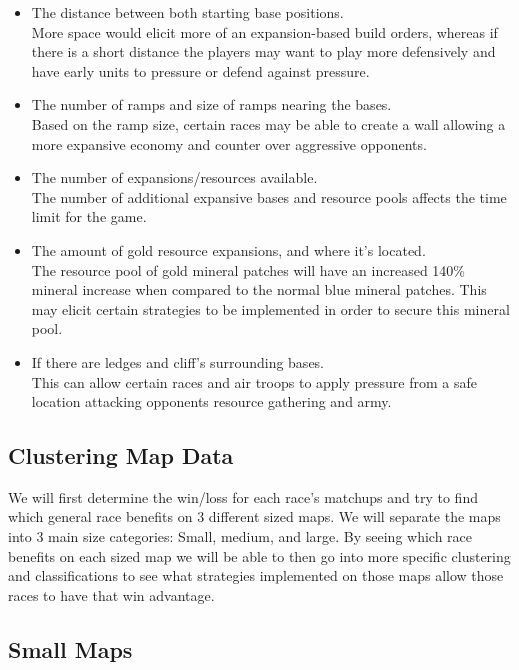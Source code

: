 \documentclass[a4paper,12pt]{report}
\begin{document}
\begin{itemize}
\item The distance between both starting base positions. \\
More space would elicit more of an expansion-based build orders, whereas if there is a short distance the players may want to play more defensively and have early units to pressure or defend against pressure.
\item The number of ramps and size of ramps nearing the bases. \\
Based on the ramp size, certain races may be able to create a wall allowing a more expansive economy and counter over aggressive opponents.
\item The number of expansions/resources available. \\
The number of additional expansive bases and resource pools affects the time limit for the game.
\item The amount of gold resource expansions, and where it’s located. \\
The resource pool of gold mineral patches will have an increased 140\% mineral increase when compared to the normal blue mineral patches. This may elicit certain strategies to be implemented in order to secure this mineral pool.
\item If there are ledges and cliff’s surrounding bases. \\
This can allow certain races and air troops to apply pressure from a safe location attacking opponents resource gathering and army.
\end{itemize}

\subsection{Clustering Map Data}

We will first determine the win/loss for each race’s matchups and try to find which general race benefits on 3 different sized maps. We will separate the maps into 3 main size categories: Small, medium, and large. By seeing which race benefits on each sized map we will be able to then go into more specific clustering and classifications to see what strategies implemented on those maps allow those races to have that win advantage.

\subsection{Small Maps}
\end{document}
